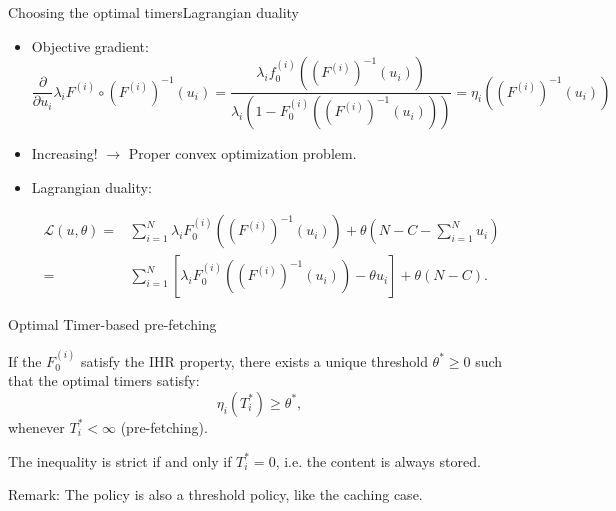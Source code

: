 \documentclass[aspectratio=169]{beamer}
\begin{document}
\begin{frame}{Choosing the optimal timers}{Lagrangian duality}

	\begin{itemize}
		\item Objective gradient:
		\begin{equation*}
			\frac{\partial}{\partial u_i} \lambda_i F^{(i)}\circ(F^{(i)})^{-1}(u_i) = \frac{\lambda_i f_0^{(i)}((F^{(i)})^{-1}(u_i))}{\lambda_i \left(1-F_0^{(i)}((F^{(i)})^{-1}(u_i))\right)} = \eta_i((F^{(i)})^{-1}(u_i))
		\end{equation*}

		\item \alert{Increasing!} $\to$ Proper convex optimization problem.
		
		\pause

		\item Lagrangian duality:
		
		\begin{align*}
  			\mathcal{L}(u,\theta) =& \sum_{i=1}^N \lambda_i F_0^{(i)}\left((F^{(i)})^{-1}(u_i)\right) + \theta \left(N-C - \sum_{i=1}^N u_i\right) \\
			=& \sum_{i=1}^N \left[\lambda_i F_0^{(i)}\left((F^{(i)})^{-1}(u_i)\right) - \theta u_i \right] + \theta (N-C).
		\end{align*}

	\end{itemize}

\end{frame}

\begin{frame}{Optimal Timer-based pre-fetching}

	\begin{theorem}
		If the $F_0^{(i)}$ satisfy the IHR property, there exists a unique threshold $\theta^*\geqslant 0$ such that the optimal timers satisfy:
		\begin{equation*}
		  \eta_i(T_i^*) \geqslant \theta^*,
		\end{equation*}
		whenever $T_i^*<\infty$ (pre-fetching). 
		
		The inequality is strict if and only if $T_i^*=0$, i.e. the content is always stored.
	\end{theorem}

	\pause

	\vfill
	
	\alert{Remark:}  The policy is also a threshold policy, like the caching case.

\end{frame}
\end{document}
